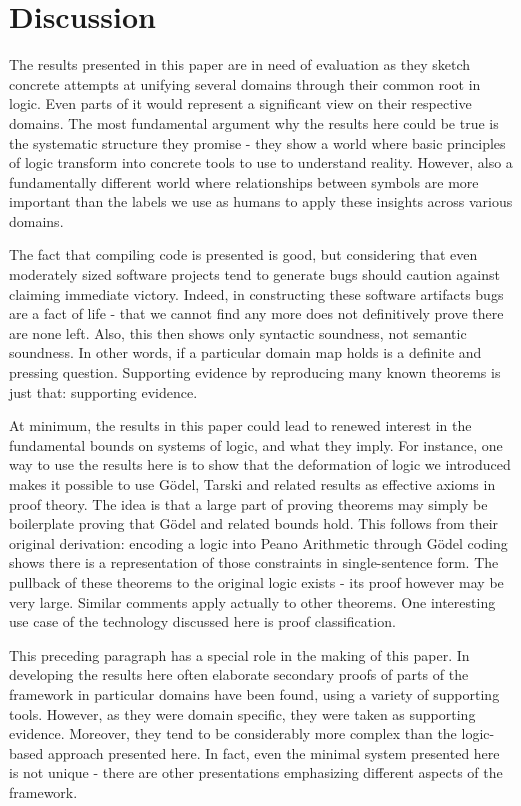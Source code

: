 \section{Discussion}
\label{sec:discussion}

The results presented in this paper are in need of evaluation as they sketch concrete attempts at unifying several domains through their common root in logic. Even parts of it would represent a significant view on their respective domains. The most fundamental argument why the results here could be true is the systematic structure they promise - they show a world where basic principles of logic transform into concrete tools to use to understand reality. However, also a fundamentally different world where relationships between symbols are more important than the labels we use as humans to apply these insights across various domains. 

The fact that compiling code is presented is good, but considering that even moderately sized software projects tend to generate bugs should caution against claiming immediate victory. Indeed, in constructing these software artifacts bugs are a fact of life - that we cannot find any more does not definitively prove there are none left. Also, this then shows only syntactic soundness, not semantic soundness. In other words, if a particular domain map holds is a definite and pressing question. Supporting evidence by reproducing many known theorems is just that: supporting evidence. 

At minimum, the results in this paper could lead to renewed interest in the fundamental bounds on systems of logic, and what they imply. For instance, one way to use the results here is to show that the deformation of logic we introduced makes it possible to use Gödel, Tarski and related results as effective axioms in proof theory. The idea is that a large part of proving theorems may simply be boilerplate proving that Gödel and related bounds hold. This follows from their original derivation: encoding a logic into Peano Arithmetic through Gödel coding shows there is a representation of those constraints in single-sentence form. The pullback of these theorems to the original logic exists - its proof however may be very large. Similar comments apply actually to other theorems. One interesting use case of the technology discussed here is proof classification. 

This preceding paragraph has a special role in the making of this paper. In developing the results here often elaborate secondary proofs of parts of the framework in particular domains have been found, using a variety of supporting tools. However, as they were domain specific, they were taken as supporting evidence. Moreover, they tend to be considerably more complex than the logic-based approach presented here. In fact, even the minimal system presented here is not unique - there are other presentations emphasizing different aspects of the framework. 

